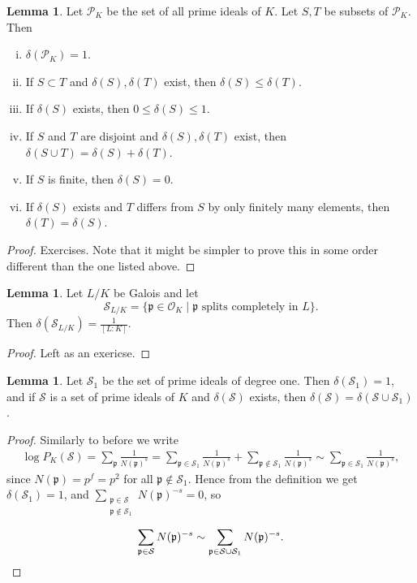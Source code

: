 \documentclass{article}
\theoremstyle{definition}
\newtheorem{lemma}[theorem]{Lemma}
\begin{document}
\begin{lemma}\label{lemma3.3}
    Let $\mathcal{P}_K$ be the set of all prime ideals of $K$. Let $S, T$ be subsets of $\mathcal{P}_K$. Then
    \begin{enumerate}[(i)]
        \item $\delta(\mathcal{P}_K)=1$.
        \item If $S \subset T$ and $\delta(S),\delta(T)$ exist, then $\delta(S)\le \delta(T)$.
        \item If $\delta(S)$ exists, then $0\le \delta(S)\le 1$.
        \item If $S$ and $T$ are disjoint and $\delta(S),\delta(T)$ exist, then $\delta(S \cup T)=\delta(S)+\delta(T)$. 
        \item If $S$ is finite, then $\delta(S)=0$.
        \item If $\delta(S)$ exists and $T$ differs from $S$ by only finitely many elements, then $\delta(T)=\delta(S)$.
    \end{enumerate}
\end{lemma}
\begin{proof}
    Exercises. Note that it might be simpler to prove this in some order different than the one listed above.
\end{proof}
\begin{lemma}\label{lemma3.4}
    Let $L/K$ be Galois and let $$\mathcal{S}_{L/K} = \{\mathfrak{p} \in \mathcal{O}_K \mid \mathfrak{p} \text{ splits completely in }L\}.$$
    Then $\delta(\mathcal{S}_{L/K}) = \frac{1}{[L:K]}$.
\end{lemma}
\begin{proof}
    Left as an exericse.
\end{proof}
\begin{lemma}\label{lemma3.5}
    Let $\mathcal{S}_1$ be the set of prime ideals of degree one. Then $\delta(\mathcal{S}_1)=1$, and if $\mathcal{S}$ is a set of prime ideals of $K$ and $\delta(\mathcal{S})$ exists, then $\delta(\mathcal{S}) = \delta(\mathcal{S} \cup \mathcal{S}_1)$.
\end{lemma}
\begin{proof}
    Similarly to before we write
    \begin{align*}
        \log P_K(\mathcal{S}) = \sum_{\mathfrak{p}}^{} \frac{1}{N(\mathfrak{p})^s} = \sum_{\mathfrak{p} \in \mathcal{S}_1}^{} \frac{1}{N(\mathfrak{p})^s} + \sum_{\mathfrak{p} \not\in \mathcal{S}_1}^{}\frac{1}{N(\mathfrak{p})^s} \sim \sum_{\mathfrak{p} \in \mathcal{S}_1}^{} \frac{1}{N(\mathfrak{p})^s}, 
    \end{align*}
    since $N(\mathfrak{p}) = p^f = p^2$ for all $\mathfrak{p} \not\in \mathcal{S}_1$. Hence from the definition we get $\delta(\mathcal{S}_1)=1$, and $\sum_{\substack{\mathfrak{p} \in \mathcal{S}\\ \mathfrak{p} \not\in \mathcal{S}_1}}^{} N(\mathfrak{p})^{-s}=0$, so 
    \[
    \sum_{\mathfrak{p} \in \mathcal{S}}^{} N(\mathfrak{p})^{-s} \sim \sum_{\mathfrak{p} \in \mathcal{S} \cup \mathcal{S}_1}^{} N(\mathfrak{p})^{-s}.
    \qedhere
    \]
\end{proof}
\end{document}
